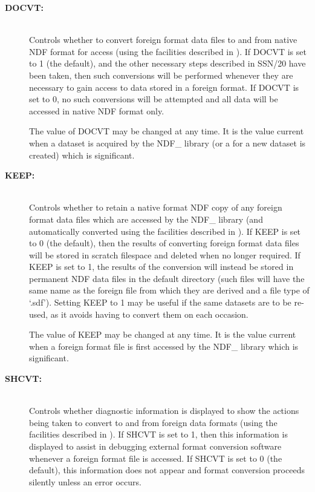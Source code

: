 \begin{description}

\item[{\bf DOCVT:}]\mbox{}\\
Controls whether to convert foreign format data files to and from
native NDF format for access (using the facilities described in
). If DOCVT is set to 1 (the default), and the
other necessary steps described in SSN/20 have been taken, then such
conversions will be performed whenever they are necessary to gain
access to data stored in a foreign format. If DOCVT is set to 0, no
such conversions will be attempted and all data will be accessed in
native NDF format only.

The value of DOCVT may be changed at any time. It is the value current
when a dataset is acquired by the NDF\_ library (or a
 for a new dataset is created)
which is significant.

\item[{\bf KEEP:}]\mbox{}\\
Controls whether to retain a native format NDF copy of any foreign
format data files which are accessed by the NDF\_ library (and
automatically converted using the facilities described in
). If
KEEP is set to 0 (the default), then the results of converting foreign
format data files will be stored in scratch filespace and deleted when
no longer required. If KEEP is set to 1, the results of the conversion
will instead be stored in permanent NDF data files in the default
directory (such files will have the same name as the foreign file from
which they are derived and a file type of `.sdf'). Setting
KEEP to 1 may be useful if the same datasets are to be re-used, as it
avoids having to convert them on each occasion.

The value of KEEP may be changed at any time. It is the value current
when a foreign format file is first accessed by the NDF\_ library
which is significant.

\item[{\bf SHCVT:}]\mbox{}\\
Controls whether diagnostic information is displayed to show the
actions being taken to convert to and from foreign data formats (using
the facilities described in ). If SHCVT is set
to 1, then this
information is displayed to assist in debugging external format
conversion software whenever a foreign format file is accessed. If
SHCVT is set to 0 (the default), this information does not appear and
format conversion proceeds silently unless an error occurs.


\end{description}
